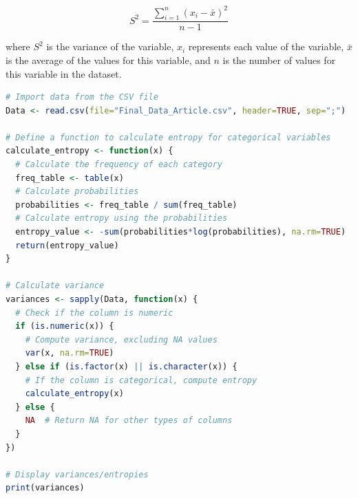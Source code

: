 \begin{equation}\label{variance}
    S^2 = \frac{\sum_{i=1}^{n} (x_i - \bar{x})^2}{n-1}
\end{equation}

where $S^2$ is the variance of the variable, $x_i$ represents each value of the variable, $\bar{x}$ is the average of the values for this variable, and $n$ is the number of values for this variable in the dataset.

\begin{lstlisting}[label=lst:variance,language=R,caption=RStudio script to calculate the variance of each numerical and categorical variables in our final dataset.]
# Import data from the CSV file
Data <- read.csv(file="Final_Data_Article.csv", header=TRUE, sep=";")

# Define a function to calculate entropy for categorical variables
calculate_entropy <- function(x) {
  # Calculate the frequency of each category
  freq_table <- table(x)
  # Calculate probabilities
  probabilities <- freq_table / sum(freq_table)
  # Calculate entropy using the probabilities
  entropy_value <- -sum(probabilities*log(probabilities), na.rm=TRUE)
  return(entropy_value)
}

# Calculate variance
variances <- sapply(Data, function(x) {
  # Check if the column is numeric
  if (is.numeric(x)) {
    # Compute variance, excluding NA values
    var(x, na.rm=TRUE)
  } else if (is.factor(x) || is.character(x)) {
    # If the column is categorical, compute entropy
    calculate_entropy(x)
  } else {
    NA  # Return NA for other types of columns
  }
})

# Display variances/entropies
print(variances)
\end{lstlisting}

